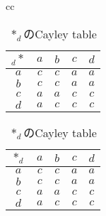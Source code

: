 \documentclass{jsarticle}
\begin{document}
\begin{table}[htbp]
\begin{center}
\begin{tabular}{cc}
\begin{minipage}{0.5\hsize}
\begin{center}
\begin{tabular}{c|cccc}
$_{d}*$&$a$&$b$&$c$&$d$ \\ \hline
$a$&$c$&$c$&$a$&$a$ \\
$b$&$c$&$c$&$a$&$a$ \\
$c$&$a$&$a$&$c$&$c$ \\
$d$&$a$&$c$&$c$&$c$  
\end{tabular}
\caption{$_{d}*$のCayley table}
\end{center}
\end{minipage}
\begin{minipage}{0.5\hsize}
\begin{center}
\begin{tabular}{c|cccc}
$*_d$&$a$&$b$&$c$&$d$ \\ \hline
$a$&$c$&$c$&$a$&$a$ \\
$b$&$c$&$c$&$a$&$a$ \\
$c$&$a$&$a$&$c$&$c$ \\
$d$&$a$&$c$&$c$&$c$ 
\end{tabular}
\caption{$*_d$のCayley table}
\end{center}
\end{minipage}
\end{tabular}
\end{center}
\end{table}
\end{document}
